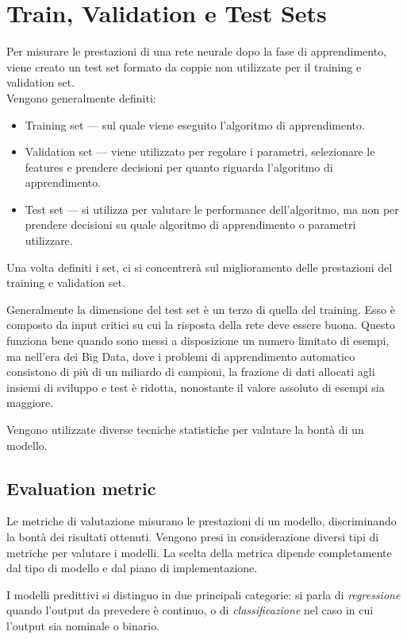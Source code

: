 \section{Train, Validation e Test Sets}
\label{sec:set}
Per misurare le prestazioni di una rete neurale dopo la fase di apprendimento, viene creato un test set formato da coppie non utilizzate per il training e validation set.\\
Vengono generalmente definiti: 
\begin{itemize}
	\item Training set --- sul quale viene eseguito l'algoritmo di apprendimento.
	\item Validation set --- viene utilizzato per regolare i parametri, selezionare le features e prendere decisioni per quanto riguarda l'algoritmo di apprendimento.
	\item Test set --- si utilizza per valutare le performance dell'algoritmo, ma non per prendere decisioni su quale algoritmo di apprendimento o parametri utilizzare. 
\end{itemize}

Una volta definiti i set, ci si concentrerà sul miglioramento delle prestazioni del training e validation set. 

Generalmente la dimensione del test set è un terzo di quella del training. Esso è composto da input critici su cui la risposta della rete deve essere buona. 
Questo funziona bene quando sono messi a disposizione un numero limitato di esempi, ma nell'era dei Big Data, dove i problemi di apprendimento automatico consistono di più di un miliardo di campioni, la frazione di dati allocati agli insiemi di sviluppo e test è ridotta, nonostante il valore assoluto di esempi sia maggiore.

Vengono utilizzate diverse tecniche statistiche per valutare la bontà di un modello.

\subsection{Evaluation metric}
\label{subsec:EvaluationMetric}

Le metriche di valutazione misurano le prestazioni di un modello, discriminando la bontà dei risultati ottenuti.
Vengono presi in considerazione diversi tipi di metriche per valutare i modelli. La scelta della metrica dipende completamente dal tipo di modello e dal piano di implementazione. 

I modelli predittivi si distinguo in due principali categorie: si parla di \emph{regressione} quando l'output da prevedere è continuo, o di \emph{classificazione} nel caso in cui l'output sia nominale o binario. 
